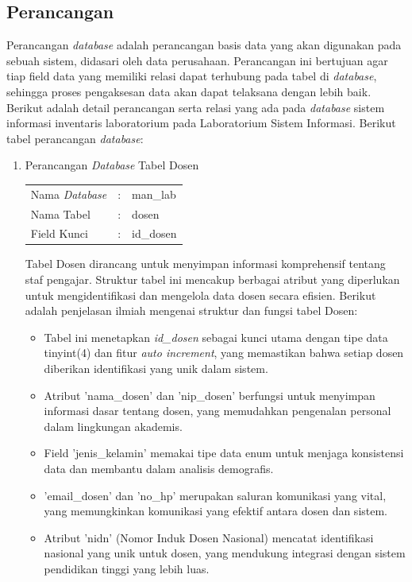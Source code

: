\subsection{Perancangan }
Perancangan \textit{database} adalah perancangan basis data yang akan digunakan pada sebuah sistem, didasari oleh data perusahaan. Perancangan ini bertujuan agar tiap field data yang memiliki relasi dapat terhubung pada tabel di \textit{database}, sehingga proses pengaksesan data akan dapat telaksana dengan lebih baik. Berikut adalah detail perancangan serta relasi yang ada pada \textit{database} sistem informasi inventaris laboratorium pada Laboratorium Sistem Informasi. Berikut tabel perancangan \textit{database}:

\begin{enumerate}

	\item Perancangan \textit{Database} Tabel Dosen \\
	      \begin{tabular}{lll}
		      Nama \textit{Database} & : & man\_lab  \\
		      Nama Tabel             & : & dosen     \\
		      Field Kunci            & : & id\_dosen \\
	      \end{tabular}

	      Tabel Dosen dirancang untuk menyimpan informasi komprehensif tentang staf pengajar. Struktur tabel ini mencakup berbagai atribut yang diperlukan untuk mengidentifikasi dan mengelola data dosen secara efisien. Berikut adalah penjelasan ilmiah mengenai struktur dan fungsi tabel Dosen:

	      \begin{itemize}
		      \item Tabel ini menetapkan \textit{id\_dosen} sebagai kunci utama dengan tipe data tinyint(4) dan fitur \textit{auto increment}, yang memastikan bahwa setiap dosen diberikan identifikasi yang unik dalam sistem.
		      \item Atribut 'nama\_dosen' dan 'nip\_dosen' berfungsi untuk menyimpan informasi dasar tentang dosen, yang memudahkan pengenalan personal dalam lingkungan akademis.
		      \item Field 'jenis\_kelamin' memakai tipe data enum untuk menjaga konsistensi data dan membantu dalam analisis demografis.
		      \item 'email\_dosen' dan 'no\_hp' merupakan saluran komunikasi yang vital, yang memungkinkan komunikasi yang efektif antara dosen dan sistem.
		      \item Atribut 'nidn' (Nomor Induk Dosen Nasional) mencatat identifikasi nasional yang unik untuk dosen, yang mendukung integrasi dengan sistem pendidikan tinggi yang lebih luas.
	      \end{itemize}


\end{enumerate}
